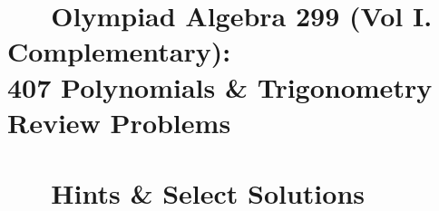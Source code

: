 \documentclass[12pt,a4paper]{memoir}
\theoremstyle{definition}
\begin{document}






% 


% 

% 

% 

% 

\appendix 

\part{\ \ \ Olympiad Algebra 299 (Vol I. Complementary):\\407 Polynomials \& Trigonometry Review Problems}




\part{\ \ \ Hints \& Select Solutions}

\printsolutions
\end{document}
